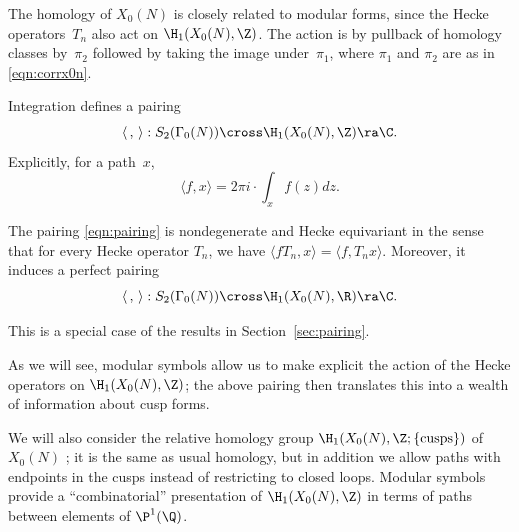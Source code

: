 The homology of $X_0(N)$ is closely related to modular forms, since
the Hecke operators~$T_n$ also act on $\H_1(X_0(N),\Z)$.  The action
is by pullback of homology classes by~$\pi_2$ followed by taking the
image under~$\pi_1$, where $\pi_1$ and $\pi_2$ are as in
\eqref{eqn:corrx0n}.

Integration defines a pairing
\begin{equation}\label{eqn:pairing}
  \langle\,,\,\rangle: S_2(\Gamma_0(N)) \cross \H_1(X_0(N),\Z) \ra \C.
\end{equation}
Explicitly, for a path~$x$,
$$
  \langle f , x \rangle = 2\pi i \cdot \int_{x} f(z) dz.
$$ 
\begin{theorem}\label{thm:pairing2}
The pairing \eqref{eqn:pairing} is nondegenerate and
Hecke equivariant in the sense that for every Hecke operator $T_n$, we have 
$\langle f T_n, x\rangle = \langle f, T_n x\rangle$.
Moreover, it induces a perfect pairing
\begin{equation}
  \langle\,,\,\rangle: S_2(\Gamma_0(N)) \cross \H_1(X_0(N),\R) \ra \C.
\end{equation}
\end{theorem}
This is a special case of the results in Section~\ref{sec:pairing}.

As we will see, modular symbols allow us to make explicit the action
of the Hecke operators on $\H_1(X_0(N),\Z)$; the above pairing then
translates this into a wealth of information about cusp forms.

We will also consider the relative homology group
$\H_1(X_0(N),\Z;\{\text{cusps}\})$ of $X_0(N)$ ; it is the same as usual homology, but in addition we
allow paths with endpoints in the cusps instead of restricting to
closed loops.
Modular symbols provide a ``combinatorial'' presentation of
$\H_1(X_0(N),\Z)$ in terms of paths between elements of $\P^1(\Q)$.


